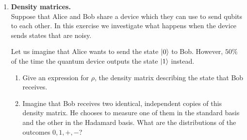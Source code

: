 \documentclass[12pt]{article}
\begin{document}
\begin{enumerate}
\item {\bf Density matrices.}\\
Suppose that Alice and Bob share a device which they can use to send qubits to each other. In this exercise we  investigate what happens when the device sends states that are noisy.

Let us imagine that Alice wants to send the state $\ket{0}$ to Bob. However, $50\%$ of the time the quantum device outputs the state $\ket{1}$ instead. 
\begin{enumerate}
\item Give an expression for $\rho$, the density matrix describing the state that Bob receives.
\item Imagine that Bob receives two identical, independent copies of this density matrix. He chooses to measure one of them in the standard basis and the other in the Hadamard basis. What are the distributions of the outcomes $0,1,+,-$?

\end{enumerate}
\end{enumerate}
\end{document}
